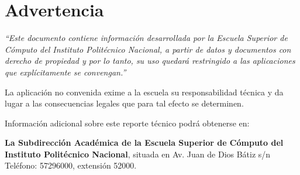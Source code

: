 \chapter{Advertencia}

\begin{tcolorbox}[colframe=blue!50!black, colback=blue!5!white, title=]
	\begin{spacing}{1.2}
		\textit{“Este documento contiene información desarrollada por la Escuela Superior de Cómputo del Instituto Politécnico Nacional, a partir de datos y documentos con derecho de propiedad y por lo tanto, su uso quedará restringido a las aplicaciones que explícitamente se convengan.”}
		
		\bigskip
		
		La aplicación no convenida exime a la escuela su responsabilidad técnica y da lugar a las consecuencias legales que para tal efecto se determinen.
		
		\bigskip
		
		Información adicional sobre este reporte técnico podrá obtenerse en:
		
		\textbf{La Subdirección Académica de la Escuela Superior de Cómputo del Instituto Politécnico Nacional}, situada en Av. Juan de Dios Bátiz s/n Teléfono: 57296000, extensión 52000.
	\end{spacing}
\end{tcolorbox}
